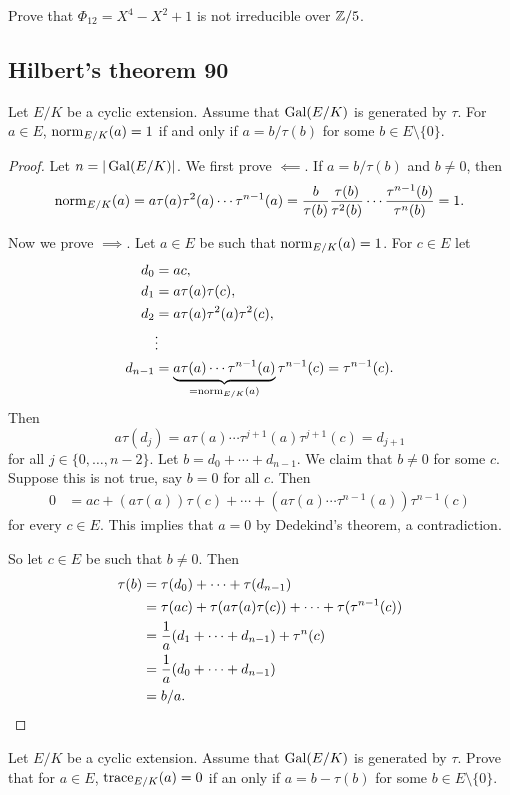 \begin{exercise}
Prove that
$\Phi_{12}=X^4-X^2+1$ is not irreducible over $\mathbb{Z}/5$. 
\end{exercise}

\subsection{Hilbert's theorem 90}

\begin{theorem}[Hilbert]
    Let $E/K$ be a cyclic extension. Assume that 
    $\operatorname{Gal}(E/K)$ is generated by $\tau$. For 
    $a\in E$, $\operatorname{norm}_{E/K}(a)=1$ if and only 
    if $a=b/\tau(b)$ for some $b\in E\setminus\{0\}$. 
\end{theorem}

\begin{proof}
    Let $n=|\operatorname{Gal}(E/K)|$. We first prove $\impliedby$. If $a=b/\tau(b)$ and $b\ne 0$, then 
    \[
    \operatorname{norm}_{E/K}(a)=a\tau(a)\tau^2(a)\cdots\tau^{n-1}(a)
    =\frac{b}{\tau(b)}\frac{\tau(b)}{\tau^2(b)}\cdots\frac{\tau^{n-1}(b)}{\tau^n(b)}=1.
    \]

    Now we prove $\implies$. Let $a\in E$ be such that $\operatorname{norm}_{E/K}(a)=1$. For 
    $c\in E$ let 
    \begin{align*}
        d_0 &= ac,\\
        d_1 &= a\tau(a)\tau(c),\\
        d_2 &= a\tau(a)\tau^2(a)\tau^2(c),\\
        &\vdots\\
        d_{n-1} &= \underbrace{a\tau(a)\cdots\tau^{n-1}(a)}_{=\operatorname{norm}_{E/K}(a)}\tau^{n-1}(c)=\tau^{n-1}(c).
    \end{align*}
    Then 
    \[
    a\tau(d_j)=a\tau(a)\cdots\tau^{j+1}(a)\tau^{j+1}(c)=d_{j+1}
    \]
    for all $j\in\{0,\dots,n-2\}$. Let $b=d_0+\cdots+d_{n-1}$. We claim that 
    $b\ne 0$ for some $c$. Suppose this is not true, say $b=0$ for all $c$. Then 
    \begin{align*}
    0&=ac+(a\tau(a))\tau(c)+\cdots+(a\tau(a)\cdots\tau^{n-1}(a))\tau^{n-1}(c)
    \end{align*}
    for every $c\in E$. This 
    implies that $a=0$ by Dedekind's theorem, a contradiction. 
    
    So let $c\in E$ be
    such that $b\ne 0$. Then 
    \begin{align*}
    \tau(b)&=\tau(d_0)+\cdots+\tau(d_{n-1})\\
    &=\tau(ac)+\tau(a\tau(a)\tau(c))+\cdots+\tau(\tau^{n-1}(c))\\
    &=\frac{1}{a}(d_1+\cdots+d_{n-1})+\tau^n(c)\\
    &=\frac{1}{a}(d_0+\cdots+d_{n-1})\\
    &=b/a.\qedhere
    \end{align*}
\end{proof}

\begin{exercise}
    Let $E/K$ be a cyclic extension. Assume that 
    $\operatorname{Gal}(E/K)$ is generated by $\tau$. Prove that for 
    $a\in E$, $\operatorname{trace}_{E/K}(a)=0$ if an only 
    if $a=b-\tau(b)$ for some $b\in E\setminus\{0\}$.  
\end{exercise}
